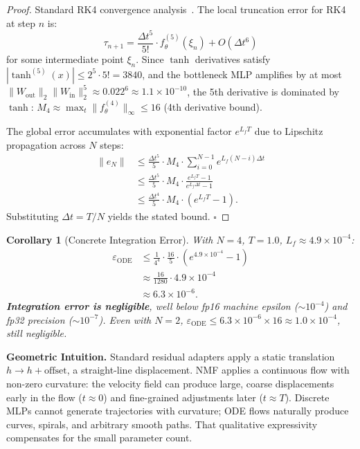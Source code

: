 \documentclass[conference]{IEEEtran}
\newtheorem{corollary}[theorem]{Corollary}
\begin{document}
\begin{proof}
Standard RK4 convergence analysis~\cite{butcher2016numerical,hairer1993solving}. The local truncation error for RK4 at step $n$ is:
\begin{equation}
\tau_{n+1} = \frac{\Delta t^5}{5!} \cdot f_\theta^{(5)}(\xi_n) + O(\Delta t^6)
\end{equation}
for some intermediate point $\xi_n$. Since $\tanh$ derivatives satisfy $|\tanh^{(5)}(x)| \leq 2^5 \cdot 5! = 3840$, and the bottleneck MLP amplifies by at most $\|W_{\text{out}}\|_2\|W_{\text{in}}\|_2^5 \approx 0.022^6 \approx 1.1\times 10^{-10}$, the 5th derivative is dominated by $\tanh$: $M_4 \approx \max_t \|f_\theta^{(4)}\|_\infty \leq 16$ (4th derivative bound).

The global error accumulates with exponential factor $e^{L_f T}$ due to Lipschitz propagation across $N$ steps:
\begin{align}
\|e_N\| &\leq \frac{\Delta t^5}{5} \cdot M_4 \cdot \sum_{i=0}^{N-1} e^{L_f (N-i)\Delta t} \nonumber\\
&\leq \frac{\Delta t^5}{5} \cdot M_4 \cdot \frac{e^{L_f T} - 1}{e^{L_f \Delta t} - 1} \nonumber\\
&\leq \frac{\Delta t^4}{5} \cdot M_4 \cdot (e^{L_f T} - 1).
\end{align}
Substituting $\Delta t = T/N$ yields the stated bound. $\square$
\end{proof}

\begin{corollary}[Concrete Integration Error]
With $N=4$, $T=1.0$, $L_f \approx 4.9\times 10^{-4}$:
\begin{align}
\varepsilon_{\text{ODE}} &\leq \frac{1}{4^4} \cdot \frac{16}{5} \cdot (e^{4.9\times 10^{-4}} - 1) \nonumber\\
&\approx \frac{16}{1280} \cdot 4.9\times 10^{-4} \nonumber\\
&\approx 6.3 \times 10^{-6}.
\end{align}
\textbf{Integration error is negligible}, well below fp16 machine epsilon ($\sim 10^{-4}$) and fp32 precision ($\sim 10^{-7}$). Even with $N=2$, $\varepsilon_{\text{ODE}} \leq 6.3\times 10^{-6} \times 16 \approx 1.0\times 10^{-4}$, still negligible.
\end{corollary}

\textbf{Geometric Intuition.} Standard residual adapters apply a static translation $h \to h + \text{offset}$, a straight-line displacement. NMF applies a continuous flow with non-zero curvature: the velocity field can produce large, coarse displacements early in the flow ($t \approx 0$) and fine-grained adjustments later ($t \approx T$). Discrete MLPs cannot generate trajectories with curvature; ODE flows naturally produce curves, spirals, and arbitrary smooth paths. That qualitative expressivity compensates for the small parameter count.
\end{document}
